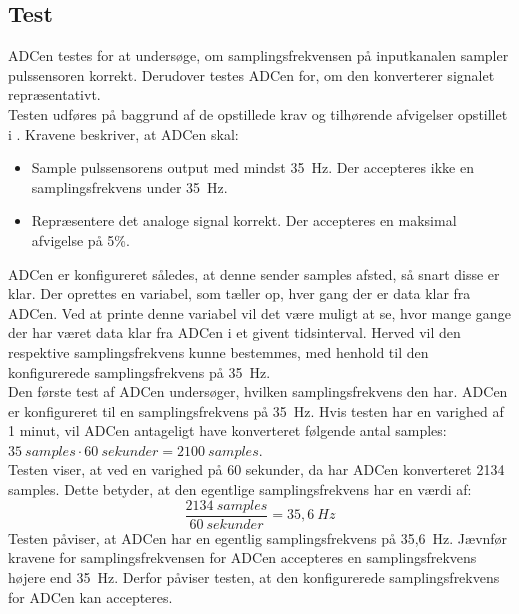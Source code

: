 \subsection{Test}
ADCen testes for at undersøge, om samplingsfrekvensen på inputkanalen sampler pulssensoren korrekt. Derudover testes ADCen for, om den konverterer signalet repræsentativt. \\
Testen udføres på baggrund af de opstillede krav og tilhørende afvigelser opstillet i . Kravene beskriver, at ADCen skal:
\begin{itemize}
	\item Sample pulssensorens output med mindst 35~Hz. Der accepteres ikke en samplingsfrekvens under 35~Hz. 
	\item Repræsentere det analoge signal korrekt. Der accepteres en maksimal afvigelse på 5\%. 
\end{itemize}
ADCen er konfigureret således, at denne sender samples afsted, så snart disse er klar. Der oprettes en variabel, som tæller op, hver gang der er data klar fra ADCen. Ved at printe denne variabel vil det være muligt at se, hvor mange gange der har været data klar fra ADCen i et givent tidsinterval. Herved vil den respektive samplingsfrekvens kunne bestemmes, med henhold til den konfigurerede samplingsfrekvens på 35~Hz. \\
Den første test af ADCen undersøger, hvilken samplingsfrekvens den har. ADCen er konfigureret til en samplingsfrekvens på 35~Hz. Hvis testen har en varighed af 1 minut, vil ADCen antageligt have konverteret følgende antal samples: $35~samples \cdot 60~sekunder = 2100~samples$. \\
Testen viser, at ved en varighed på 60 sekunder, da har ADCen konverteret 2134 samples. Dette betyder, at den egentlige samplingsfrekvens har en værdi af:
\begin{equation}
\frac{2134~samples}{60~sekunder} = 35,6~Hz 
\end{equation}
Testen påviser, at ADCen har en egentlig samplingsfrekvens på 35,6~Hz. Jævnfør kravene for samplingsfrekvensen for ADCen accepteres en samplingsfrekvens højere end 35~Hz. Derfor påviser testen, at den konfigurerede samplingsfrekvens for ADCen kan accepteres. 

